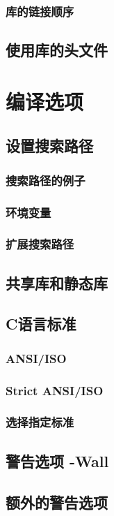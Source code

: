 \documentclass[lang=cn,12pt,newtx,scheme=chinese]{elegantbook}
\begin{document}
\subsection{库的链接顺序}
\section{使用库的头文件}

\chapter{编译选项}
\section{设置搜索路径}
\subsection{搜索路径的例子}
\subsection{环境变量}
\subsection{扩展搜索路径}
\section{共享库和静态库}
\section{C语言标准}
\subsection{ANSI/ISO}
\subsection{Strict ANSI/ISO}
\subsection{选择指定标准}
\section{警告选项 -Wall}
\section{额外的警告选项}
\end{document}
